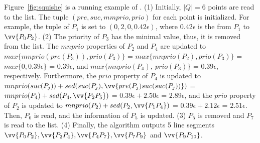\begin{example}
\label{exm-alg-squishe}
Figure~\ref{fig:squishe} is a running example of \squishe.
%
(1) Initially, $|Q| = 6$ points are read to the list. The tuple $(pre, suc, mmprio, prio)$ for each point is initialized. For example, the tuple of $P_1$ is set to $(0, 2, 0, 0.42\epsilon)$, where $0.42\epsilon$ is the \sed from $P_1$ to $\vv{P_0P_2}$.
%
(2) The priority of $P_3$ has the minimal value, thus, it is removed from the list.
The $mnprio$ properties of $P_2$ and $P_4$ are updated to $max\{mnprio(pre(P_3)), prio(P_3)\}$ = $max\{mnprio(P_2), prio(P_3)\}$ = $max\{0, 0.39\epsilon\}$ = $0.39\epsilon$, and $max\{mnprio(P_4), ~prio(P_3)\}$ = $0.39\epsilon$, respectively.
Furthermore, the $prio$ property of $P_4$ is updated to $mnprio(suc(P_j)) + sed(suc(P_j),\vv{pre(P_{j})suc(suc(P_{j}))})$ = $mnprio(P_4) + sed(P_4,\vv{P_2P_5})$ = $0.39\epsilon + 2.50\epsilon$ = $2.89\epsilon$, and the $prio$ property of $P_2$ is updated to $mnprio(P_2) + sed(P_2,\vv{P_1P_4})$ = $0.39\epsilon + 2.12\epsilon$ = $2.51\epsilon$.
Then, $P_6$ is read, and the information of $P_5$ is updated.
%
(3) $P_5$ is removed and $P_7$ is read to the list.
%
(4) Finally, the algorithm outputs 5 line segments $\vv{P_0P_2},\vv{P_2P_4},\vv{P_4P_7},\vv{P_7P_9}$ and $\vv{P_9P_{10}}$.
\end{example}





